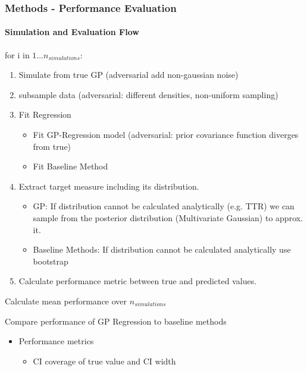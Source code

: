 \documentclass[
	8pt, %
]{beamer}
\begin{document}
\begin{frame}
	\frametitle{Methods - Performance Evaluation}
	\framesubtitle{Simulation and Evaluation Flow}
		for i in $1 \dots n_{simulations}$:
		\begin{enumerate}
			\item Simulate from true GP (adversarial add non-gaussian noise)
			\item subsample data (adversarial: different densities, non-uniform sampling)
			\item Fit Regression
			\begin{itemize}
				\item Fit GP-Regression model (adversarial: prior covariance function diverges from true)
				\item Fit Baseline Method
			\end{itemize}
			\item Extract target measure including its distribution.
				\begin{itemize}
					\item GP: If distribution cannot be calculated analytically (e.g. TTR) we can
					sample from the posterior distribution (Multivariate Gaussian) to approx. it.
					\item Baseline Methods: If distribution cannot be calculated analytically use bootstrap
				\end{itemize}
			\item Calculate performance metric between true and predicted values.
		\end{enumerate}
	\smallskip
	Calculate mean performance over $n_{simulations}$
	\smallskip

	Compare performance of GP Regression to baseline methods

	\bigskip %

	\begin{itemize}
		\item Performance metrics
		\begin{itemize}
			\item CI coverage of true value and CI width
		\end{itemize}
	\end{itemize}

\end{frame}
\end{document}
